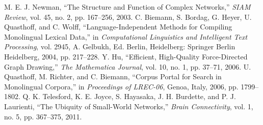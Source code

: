 \documentclass[11pt, a4paper]{article}
\begin{document}
\newpage
\begin{thebibliography}{9}
     M. E. J. Newman, “The Structure and Function of Complex Networks,” \emph{SIAM Review}, vol. 45, no. 2, pp. 167–256, 2003.
     C. Biemann, S. Bordag, G. Heyer, U. Quasthoff, and C. Wolff, “Language-Independent Methods for Compiling Monolingual Lexical Data,” in \emph{Computational Linguistics and Intelligent Text Processing}, vol. 2945, A. Gelbukh, Ed. Berlin, Heidelberg: Springer Berlin Heidelberg, 2004, pp. 217–228.
     Y. Hu, “Efficient, High-Quality Force-Directed Graph Drawing,” \emph{The Mathematica Journal}, vol. 10, no. 1, pp. 37–71, 2006.
    U. Quasthoff, M. Richter, and C. Biemann, “Corpus Portal for Search in Monolingual Corpora,” in \emph{Proceedings of LREC-06}, Genoa, Italy, 2006, pp. 1799–1802.
    Q. K. Telesford, K. E. Joyce, S. Hayasaka, J. H. Burdette, and P. J. Laurienti, “The Ubiquity of Small-World Networks,” \emph{Brain Connectivity}, vol. 1, no. 5, pp. 367–375, 2011.
\end{thebibliography}

\listoftables

\listoffigures
\end{document}
